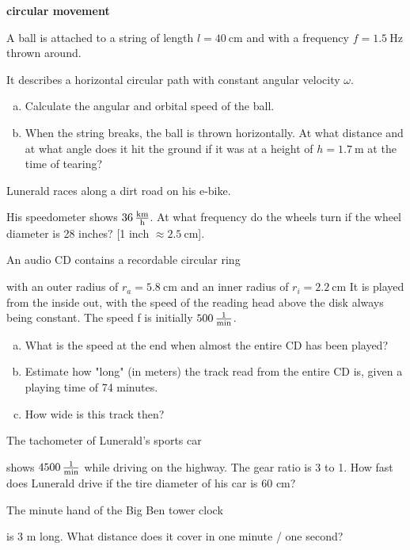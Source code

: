 \documentclass[a4paper]{article}
\begin{document}
	{\bf circular movement}
	\begin{enumerate}[1.]
		
		{\bf \item A ball is attached to a string of length $l=\SI{40}{\centi \meter}$ and with a frequency
			$f=\SI{1.5}{\hertz}$ thrown around.} It describes a horizontal circular path with constant angular velocity $\omega$.
		
		\begin{enumerate}[a)]
			\item Calculate the angular and orbital speed of the ball.
			\item When the string breaks, the ball is thrown horizontally. At what distance and at what angle does it hit the ground if it was at a height of $h=\SI{1.7}{\meter}$ at the time of tearing?
		\end{enumerate}
		
		{\bf \item Lunerald races along a dirt road on his e-bike.} His speedometer shows $\SI{36}{\kilo\meter\over \hour}$. At what frequency do the wheels turn if the wheel diameter is 28 inches?
		[1 inch $\approx \SI{2.5}{\centi\meter}$].
		
		{\bf \item An audio CD contains a recordable circular ring} with an outer radius of $r_a=\SI{5.8}{\centi\meter}$ and an inner radius of $r_i=\SI{2.2}{ \centi\meter}$ It is played from the inside out, with the speed of the reading head above the disk always being constant. The speed f is initially $\SI{500}{1\over\minute}$.
		\begin{enumerate}[a)]
			\item What is the speed at the end when almost the entire CD has been played?
			\item Estimate how "long" (in meters) the track read from the entire CD is, given a playing time of 74 minutes.
			\item How wide is this track then?
		\end{enumerate}
		
		
		{\bf \item The tachometer of Lunerald's sports car} shows $\SI{4500}{1\over\minute}$ while driving on the highway. The gear ratio is 3 to 1. How fast does Lunerald drive if the tire diameter of his car is 60 cm?
		
		{\bf \item The minute hand of the Big Ben tower clock } is 3 m long. What distance does it cover in one minute / one second?
		

\end{enumerate}
\end{document}
